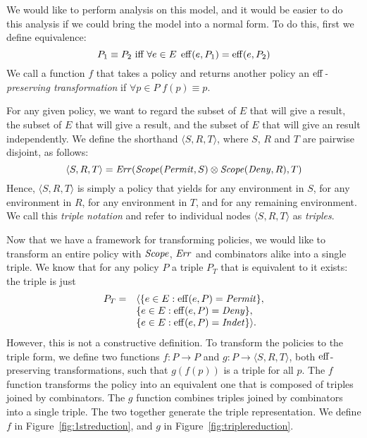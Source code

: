 We would like to perform analysis on this model, and it would be
easier to do this analysis if we could bring the model into a normal
form.  To do this, first we define equivalence:
\begin{equation*}
  P_1 \equiv P_2 \text{ iff } \forall e \in E \; \operatorname{eff} (e, P_1) = \operatorname{eff} (e, P_2)
\end{equation*}
We call a function $f$ that takes a policy and returns another
policy an \emph{$\operatorname{eff}$-preserving transformation} if $\forall p \in P
\; f (p) \equiv p$.

For any given policy, we want to regard the subset of $E$ that will
give a \Permit{} result, the subset of $E$ that will give a \Deny{}
result, and the subset of $E$ that will give an \Indeterminate{} result
independently.  We define the shorthand $\langle S, R, T \rangle$,
where $S$, $R$ and $T$ are pairwise disjoint, as follows:
\begin{equation*}
  \langle S, R, T \rangle = \text{\textit{Err}} (\text{\textit{Scope}} (\text{\textit{Permit}}, S) \otimes \text{\textit{Scope}} (\text{\textit{Deny}}, R), T)
\end{equation*}
Hence, $\langle S, R, T \rangle$ is simply a policy
that yields \Permit{} for any environment in $S$,
\Deny{} for any environment in $R$,
\Indeterminate{} for any environment in $T$,
and \NotApplicable{} for any remaining environment.
We call this \emph{triple notation} and refer to individual nodes
$\langle S, R, T \rangle$ as \emph{triples}.

Now that we have a framework for transforming policies, we would like
to transform an entire policy with $\text{\textit{Scope}}$, $\text{\textit{Err}}$ and combinators alike
into a single triple.  We know that for any policy $P$ a triple $P_T$
that is equivalent to it exists: the triple is just 
\[ 
\begin{array}{ll} 
P_T = & \langle \{
e \in E : \operatorname{eff} (e, P) = \text{\textit{Permit}} \}, \\
&  \{ e \in E : \operatorname{eff} (e, P) = \text{\textit{Deny}} \}, \\
& \{ e \in E : \operatorname{eff} (e, P) = \text{\textit{Indet}} \}\rangle.
\end{array}
\]  
However,
this is not a constructive definition.  To transform the policies to
the triple form, we define two functions 
$f : P   \rightarrow  P$ and $g : P \rightarrow \langle S, R, T \rangle$, both
$\operatorname{eff}$-preserving transformations, such that $g (f(p))$ is a triple
for all $p$.  The $f$ function transforms the policy into an
equivalent one that is composed of triples joined by combinators.  The
$g$ function combines triples joined by combinators into a single
triple.  The two together generate the triple representation.  We
define $f$ in Figure~\ref{fig:1streduction}, and $g$ in
Figure~\ref{fig:triplereduction}.

